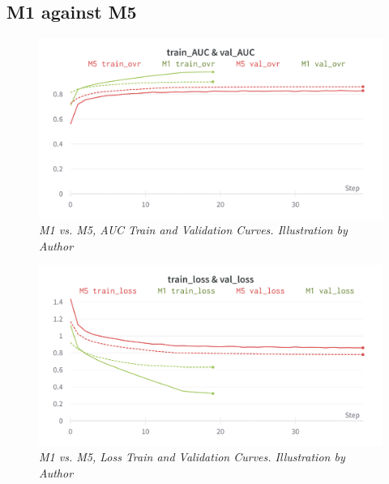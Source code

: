 \newpage


\subsection{M1 against M5}

\begin{figure}[H]
\centering
    \includegraphics[width=\textwidth]{imatges/results/AUCM1M5.png}
\caption[M1 vs. M5, AUC Train and Validation Curves]{\textit{M1 vs. M5, AUC Train and Validation Curves. Illustration by Author}}
\end{figure}


\begin{figure}[H]
\centering
    \includegraphics[width=\textwidth]{imatges/results/LossM1M5.png}
\caption[M1 vs. M5, Loss Train and Validation Curves]{\textit{M1 vs. M5, Loss Train and Validation Curves. Illustration by Author}}
\end{figure}

\newpage

